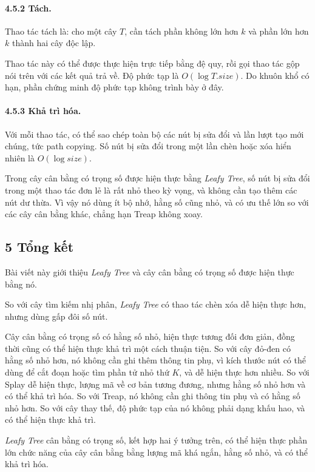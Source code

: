 \documentclass[11pt]{article}
\begin{document}
\paragraph{4.5.2 Tách.}
Thao tác tách là: cho một cây \(T\), cần tách phần không lớn hơn \(k\) và phần
lớn hơn \(k\) thành hai cây độc lập.

Thao tác này có thể được thực hiện trực tiếp bằng đệ quy, rồi gọi thao tác gộp
nói trên với các kết quả trả về. Độ phức tạp là \(O(\log T.\textit{size})\).
Do khuôn khổ có hạn, phần chứng minh độ phức tạp không trình bày ở đây.

\paragraph{4.5.3 Khả trì hóa.}
Với mỗi thao tác, có thể sao chép toàn bộ các nút bị sửa đổi và lần lượt tạo
mới chúng, tức path copying. Số nút bị sửa đổi trong một lần chèn hoặc xóa hiển
nhiên là \(O(\log \textit{size})\).

Trong cây cân bằng có trọng số được hiện thực bằng \emph{Leafy Tree}, số nút bị
sửa đổi trong một thao tác đơn lẻ là rất nhỏ theo kỳ vọng, và không cần tạo
thêm các nút dư thừa. Vì vậy nó dùng ít bộ nhớ, hằng số cũng nhỏ, và có ưu thế
lớn so với các cây cân bằng khác, chẳng hạn Treap không xoay.

\subsection*{5 Tổng kết}

Bài viết này giới thiệu \emph{Leafy Tree} và cây cân bằng có trọng số được hiện
thực bằng nó.

So với cây tìm kiếm nhị phân, \emph{Leafy Tree} có thao tác chèn xóa dễ hiện
thực hơn, nhưng dùng gấp đôi số nút.

Cây cân bằng có trọng số có hằng số nhỏ, hiện thực tương đối đơn giản, đồng
thời cũng có thể hiện thực khả trì một cách thuận tiện. So với cây đỏ-đen có
hằng số nhỏ hơn, nó không cần ghi thêm thông tin phụ, vì kích thước nút có thể
dùng để cắt đoạn hoặc tìm phần tử nhỏ thứ \(K\), và dễ hiện thực hơn nhiều. So
với Splay dễ hiện thực, lượng mã về cơ bản tương đương, nhưng hằng số nhỏ hơn
và có thể khả trì hóa. So với Treap, nó không cần ghi thông tin phụ và có hằng
số nhỏ hơn. So với cây thay thế, độ phức tạp của nó không phải dạng khấu hao,
và có thể hiện thực khả trì.

\emph{Leafy Tree} cân bằng có trọng số, kết hợp hai ý tưởng trên, có thể hiện
thực phần lớn chức năng của cây cân bằng bằng lượng mã khá ngắn, hằng số nhỏ,
và có thể khả trì hóa.
\end{document}
